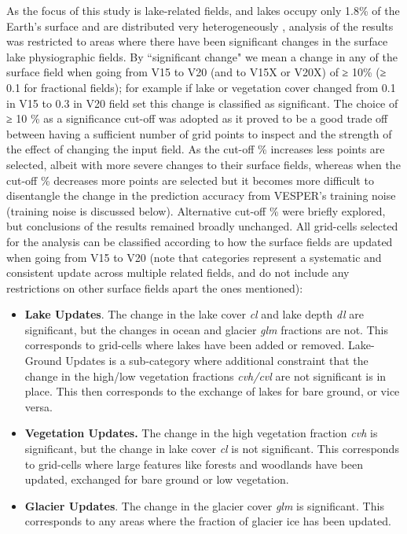 \documentclass[hess, twostagejnl]{copernicus}
\begin{document}
\noindent As the focus of this study is lake-related fields, and lakes occupy only 1.8\% of the Earth’s surface and are distributed very heterogeneously \citep{Choulga2014}, analysis of the results was restricted to areas where there have been significant changes in the surface lake physiographic fields. By ``significant change" we mean a change in any of the surface field when going from V15 to V20 (and to V15X or V20X) of ≥ 10\% (≥ 0.1 for fractional fields); for example if lake or vegetation cover changed from 0.1 in V15 to 0.3 in V20 field set this change is classified as significant. The choice of ≥ 10 \% as a significance cut-off was adopted as it proved to be a good trade off between having a sufficient number of grid points to inspect and the strength of the effect of changing the input field. As the cut-off \% increases less points are selected, albeit with more severe changes to their surface fields, whereas when the cut-off \% decreases more points are selected but it becomes more difficult to disentangle the change in the prediction accuracy from VESPER’s training noise (training noise is discussed below). Alternative cut-off \% were briefly explored, but conclusions of the results remained broadly unchanged. All grid-cells selected for the analysis can be classified according to how the surface fields are updated when going from V15 to V20 (note that categories represent a systematic and consistent update across multiple related fields, and do not include any restrictions on other surface fields apart the ones mentioned): 
\begin{itemize}
	\item \textbf{Lake Updates}. The change in the lake cover \textit{cl} and lake depth \textit{dl} are significant, but the changes in ocean and glacier \textit{glm} fractions are not. This corresponds to grid-cells where lakes have been added or removed. Lake-Ground Updates is a sub-category where additional constraint that the change in the high/low vegetation fractions \textit{cvh/cvl} are not significant is in place. This then corresponds to the exchange of lakes for bare ground, or vice versa.
	\item \textbf{Vegetation Updates.} The change in the high vegetation fraction \textit{cvh} is significant, but the change in lake cover \textit{cl} is not significant. This corresponds to grid-cells where large features like forests and woodlands have been updated, exchanged for bare ground or low vegetation.
	\item \textbf{Glacier Updates}. The change in the glacier cover \textit{glm} is significant. This corresponds to any areas where the fraction of glacier ice has been updated.
\end{itemize}
\end{document}
